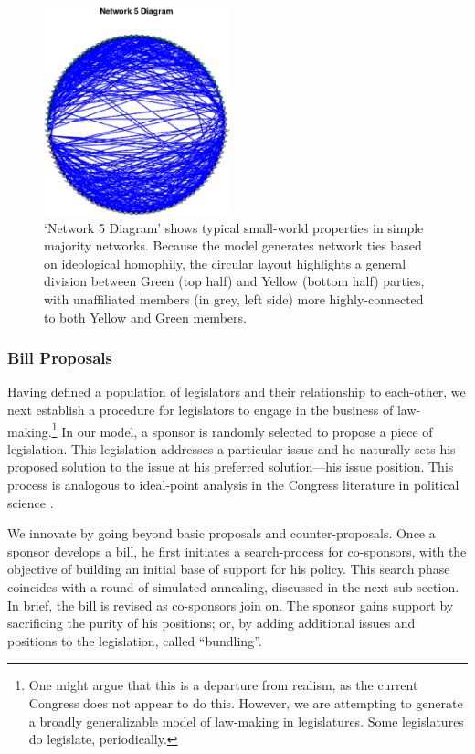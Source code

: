 \documentclass[pdftex,12pt]{llncs}
\begin{document}
\begin{figure}
  \includegraphics[width=0.48\textwidth]{smallworldnetwork.eps}
 \caption[ ]{`Network 5 Diagram' shows typical small-world properties in simple majority networks.  
Because the model generates network ties based on ideological homophily, the circular layout highlights a general division between Green (top half) and Yellow (bottom half) parties, with unaffiliated members (in grey, left side) more highly-connected to both Yellow and Green members.}
 \label{smallworldnetwork}
\end{figure}

\subsubsection{Bill Proposals}
Having defined a population of legislators and their relationship to each-other, we next establish a procedure for legislators to engage in the business of law-making.\footnote{One might argue that this is a departure from realism, as the current Congress does not appear to do this. However, we are attempting to generate a broadly generalizable model of law-making in legislatures. Some legislatures do legislate, periodically.} 
In our model, a sponsor is randomly selected to propose a piece of legislation. 
This legislation addresses a particular issue and he naturally sets his proposed solution to the issue at his preferred solution---his issue position. 
This process is analogous to ideal-point analysis in the Congress literature in political science \parencite{k98}. 

We innovate by going beyond basic proposals and counter-proposals. 
Once a sponsor develops a bill, he first initiates a search-process for co-sponsors, with the objective of building an initial base of support for his policy. 
This search phase coincides with a round of simulated annealing, discussed in the next sub-section. 
In brief, the bill is revised as co-sponsors join on. 
The sponsor gains support by sacrificing the purity of his positions; or, by adding additional issues and positions to the legislation, called ``bundling''.  
\end{document}
